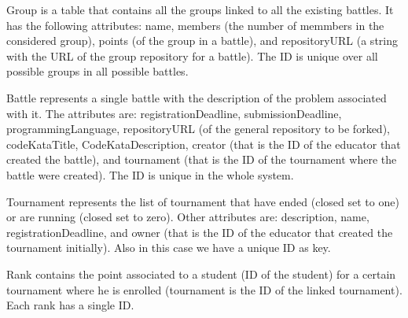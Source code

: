 \documentclass[12pt, a4paper]{report}
\begin{document}
    Group is a table that contains all the groups linked to all the existing battles. 
    It has the following attributes: name, members (the number of memmbers in the considered group), points (of the group in a battle), and repositoryURL (a string with the URL of the group repository for a battle).
    The ID is unique over all possible groups in all possible battles.
    
    Battle represents a single battle with the description of the problem associated with it. 
    The attributes are: registrationDeadline, submissionDeadline, programmingLanguage, repositoryURL (of the general repository to be forked), codeKataTitle, CodeKataDescription, creator (that is the ID of the educator that created the battle), and tournament (that is the ID of the tournament where the battle were created). 
    The ID is unique in the whole system. 

    Tournament represents the list of tournament that have ended (closed set to one) or are running (closed set to zero). 
    Other attributes are: description, name, registrationDeadline, and owner (that is the ID of the educator that created the tournament initially). 
    Also in this case we have a unique ID as key. 

    Rank contains the point associated to a student (ID of the student) for a certain tournament where he is enrolled (tournament is the ID of the linked tournament). 
    Each rank has a single ID. 
\end{document}
